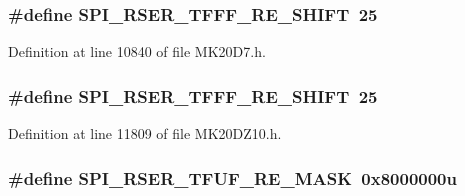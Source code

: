 \subsubsection[{\texorpdfstring{S\+P\+I\+\_\+\+R\+S\+E\+R\+\_\+\+T\+F\+F\+F\+\_\+\+R\+E\+\_\+\+S\+H\+I\+FT}{SPI_RSER_TFFF_RE_SHIFT}}]{\setlength{\rightskip}{0pt plus 5cm}\#define S\+P\+I\+\_\+\+R\+S\+E\+R\+\_\+\+T\+F\+F\+F\+\_\+\+R\+E\+\_\+\+S\+H\+I\+FT~25}\hypertarget{group___s_p_i___register___masks_ga6b7e6d97146fb2244a8b1fb870cf980b}{}\label{group___s_p_i___register___masks_ga6b7e6d97146fb2244a8b1fb870cf980b}


Definition at line 10840 of file M\+K20\+D7.\+h.

\subsubsection[{\texorpdfstring{S\+P\+I\+\_\+\+R\+S\+E\+R\+\_\+\+T\+F\+F\+F\+\_\+\+R\+E\+\_\+\+S\+H\+I\+FT}{SPI_RSER_TFFF_RE_SHIFT}}]{\setlength{\rightskip}{0pt plus 5cm}\#define S\+P\+I\+\_\+\+R\+S\+E\+R\+\_\+\+T\+F\+F\+F\+\_\+\+R\+E\+\_\+\+S\+H\+I\+FT~25}\hypertarget{group___s_p_i___register___masks_ga6b7e6d97146fb2244a8b1fb870cf980b}{}\label{group___s_p_i___register___masks_ga6b7e6d97146fb2244a8b1fb870cf980b}


Definition at line 11809 of file M\+K20\+D\+Z10.\+h.

\subsubsection[{\texorpdfstring{S\+P\+I\+\_\+\+R\+S\+E\+R\+\_\+\+T\+F\+U\+F\+\_\+\+R\+E\+\_\+\+M\+A\+SK}{SPI_RSER_TFUF_RE_MASK}}]{\setlength{\rightskip}{0pt plus 5cm}\#define S\+P\+I\+\_\+\+R\+S\+E\+R\+\_\+\+T\+F\+U\+F\+\_\+\+R\+E\+\_\+\+M\+A\+SK~0x8000000u}\hypertarget{group___s_p_i___register___masks_ga245d7987838cad9b4392b051fbd6fb06}{}\label{group___s_p_i___register___masks_ga245d7987838cad9b4392b051fbd6fb06}


